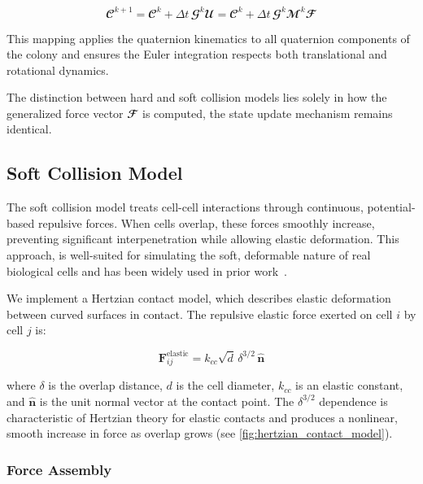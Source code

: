 \documentclass[conference]{IEEEtran}
\begin{document}
\begin{equation} \label{eq:colony_update}
    \mathbfcal{C}^{k+1} = \mathbfcal{C}^k + \Delta t \, \mathbfcal{G}^k \mathbfcal{U} = \mathbfcal{C}^k + \Delta t \, \mathbfcal{G}^k \mathbfcal{M}^k \mathbfcal{F}
\end{equation}

This mapping applies the quaternion kinematics to all quaternion components of the colony and ensures the Euler integration respects both translational and rotational dynamics.

The distinction between hard and soft collision models lies solely in how the generalized force vector $\mathbfcal{F}$ is computed, the state update mechanism remains identical.

\subsection{Soft Collision Model}

The soft collision model treats cell-cell interactions through continuous, potential-based repulsive forces. When cells overlap, these forces smoothly increase, preventing significant interpenetration while allowing elastic deformation. This approach, is well-suited for simulating the soft, deformable nature of real biological cells and has been widely used in prior work~\cite{Warren2019, You2018,Blanchard2015,Ghosh2015,Khan_2024,You_2021,Valdez2025,Rudge2013,Langeslay_2023}.

We implement a Hertzian contact model, which describes elastic deformation between curved surfaces in contact. The repulsive elastic force exerted on cell $i$ by cell $j$ is:

\begin{equation} \label{eq:hertzian_contact_model}
    \mathbf{F}^{\text{elastic}}_{ij} = k_{cc} \sqrt{d} \, \delta^{3/2} \, \hat{\mathbf{n}}
\end{equation}

where $\delta$ is the overlap distance, $d$ is the cell diameter, $k_{cc}$ is an elastic constant, and $\hat{\mathbf{n}}$ is the unit normal vector at the contact point. The $\delta^{3/2}$ dependence is characteristic of Hertzian theory for elastic contacts and produces a nonlinear, smooth increase in force as overlap grows (see \autoref{fig:hertzian_contact_model}).

\subsubsection{Force Assembly}
\end{document}
